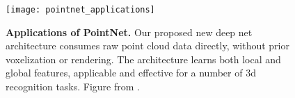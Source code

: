 \begin{figure}[!htbp]
    \texttt{[image: pointnet\_applications]}
    \caption{
        \textbf{Applications of PointNet.} 
        Our proposed new deep net architecture consumes raw point
        cloud data directly, without prior voxelization or
        rendering. The architecture learns both local and global
        features, applicable and effective for a number of 3d
        recognition tasks.
        Figure from \cite{qi2017pointnet}.
    } \label{fig:applications}

\end{figure}
